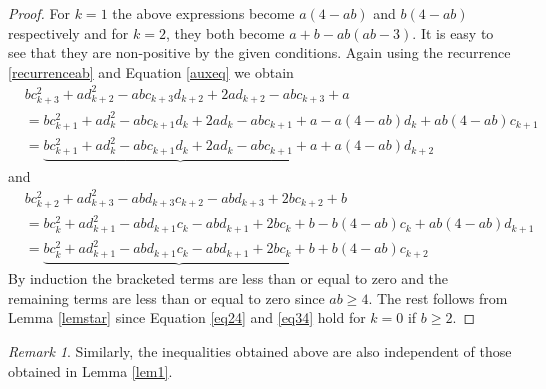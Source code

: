 \documentclass[12pt,reqno]{amsart}
\theoremstyle{plain}
\theoremstyle{definition}
\theoremstyle{remark}
\newtheorem{rem}{Remark}
\begin{document}
\begin{proof}
    For $k=1$ the above expressions become $a(4-ab)$ and $b(4-ab)$ respectively and for $k=2$, they both become $a+b-ab(ab-3)$. It is easy to see that they are non-positive by the given conditions. Again using the recurrence \ref{recurrenceab} and Equation \ref{auxeq} we obtain
    \begin{align*}
        &bc_{k+3}^2+ad_{k+2}^2-abc_{k+3}d_{k+2}+2ad_{k+2}-abc_{k+3}+a\\
        &=bc_{k+1}^2+ad_k^2-abc_{k+1}d_k+2ad_k-abc_{k+1}+a-a(4-ab)d_{k}+ab(4-ab)c_{k+1}\\
        &=\underbrace{bc_{k+1}^2+ad_k^2-abc_{k+1}d_k+2ad_k-abc_{k+1}+a}+a(4-ab)d_{k+2}
    \end{align*}
    and
    \begin{align*}
        &bc_{k+2}^2+ad_{k+3}^2-abd_{k+3}c_{k+2}-abd_{k+3}+2bc_{k+2}+b\\
        &=bc_k^2+ad_{k+1}^2-abd_{k+1}c_k-abd_{k+1}+2bc_k+b-b(4-ab)c_{k}+ab(4-ab)d_{k+1}\\
        &=\underbrace{bc_k^2+ad_{k+1}^2-abd_{k+1}c_k-abd_{k+1}+2bc_k+b}+b(4-ab)c_{k+2}
    \end{align*}
    By induction the bracketed terms are less than or equal to zero and the remaining terms are less than or equal to zero since $ab\geq 4$. The rest follows from Lemma \ref{lemstar} since Equation \ref{eq24} and \ref{eq34} hold for $k=0$ if $b\geq 2.$
\end{proof}
\begin{rem}
    Similarly, the inequalities obtained above are also independent of those obtained in Lemma \ref{lem1}.
\end{rem}
\end{document}
